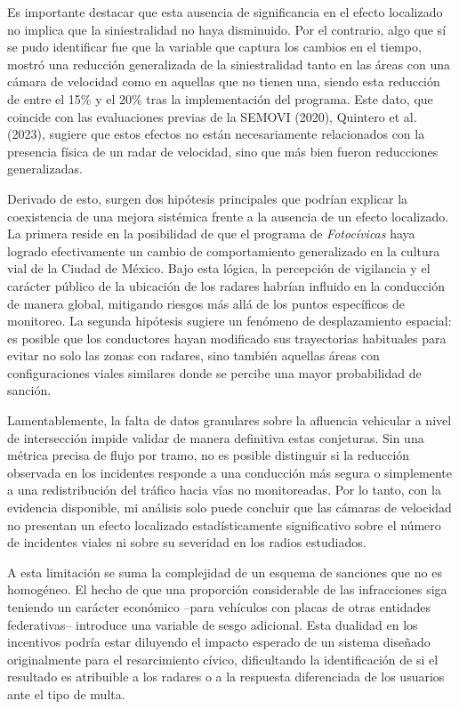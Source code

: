 Es importante destacar que esta ausencia de significancia en el efecto localizado no implica que la siniestralidad no haya disminuido. Por el contrario, algo que sí se pudo identificar fue que la variable que captura los cambios en el tiempo, mostró una reducción generalizada de la siniestralidad tanto en las áreas con una cámara de velocidad como en aquellas que no tienen una, siendo esta reducción de entre el 15\% y el 20\% tras la implementación del programa. Este dato, que coincide con las evaluaciones previas de la SEMOVI (2020), Quintero et al. (2023), sugiere que estos efectos no están necesariamente relacionados con la presencia física de un radar de velocidad, sino que más bien fueron reducciones generalizadas. 

Derivado de esto, surgen dos hipótesis principales que podrían explicar la coexistencia de una mejora sistémica frente a la ausencia de un efecto localizado. La primera reside en la posibilidad de que el programa de \textit{Fotocívicas} haya logrado efectivamente un cambio de comportamiento generalizado en la cultura vial de la Ciudad de México. Bajo esta lógica, la percepción de vigilancia y el carácter público de la ubicación de los radares habrían influido en la conducción de manera global, mitigando riesgos más allá de los puntos específicos de monitoreo. La segunda hipótesis sugiere un fenómeno de desplazamiento espacial: es posible que los conductores hayan modificado sus trayectorias habituales para evitar no solo las zonas con radares, sino también aquellas áreas con configuraciones viales similares donde se percibe una mayor probabilidad de sanción.

Lamentablemente, la falta de datos granulares sobre la afluencia vehicular a nivel de intersección impide validar de manera definitiva estas conjeturas. Sin una métrica precisa de flujo por tramo, no es posible distinguir si la reducción observada en los incidentes responde a una conducción más segura o simplemente a una redistribución del tráfico hacia vías no monitoreadas. Por lo tanto, con la evidencia disponible, mi análisis solo puede concluir que las cámaras de velocidad no presentan un efecto localizado estadísticamente significativo sobre el número de incidentes viales ni sobre su severidad en los radios estudiados.

A esta limitación se suma la complejidad de un esquema de sanciones que no es homogéneo. El hecho de que una proporción considerable de las infracciones siga teniendo un carácter económico --para vehículos con placas de otras entidades federativas-- introduce una variable de sesgo adicional. Esta dualidad en los incentivos podría estar diluyendo el impacto esperado de un sistema diseñado originalmente para el resarcimiento cívico, dificultando la identificación de si el resultado es atribuible a los radares o a la respuesta diferenciada de los usuarios ante el tipo de multa.

